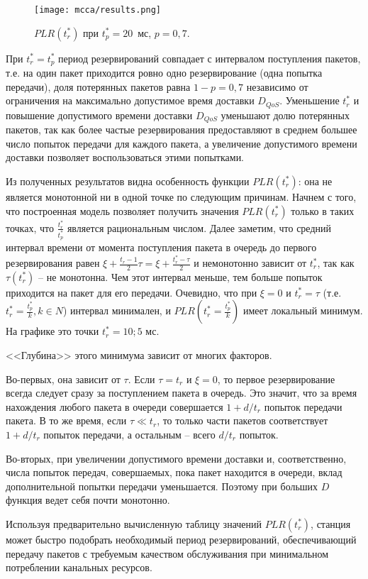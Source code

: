\begin{figure}[!htbp]
\centering
    \texttt{[image: mcca/results.png]} \\
    \caption{\label{fig:mcca:an:results:plr_vs_tc} $PLR(t_r^*)$ при $t_p^* = 20$~мс, $p = 0,7$.}
\end{figure}

При  $t_r^* = t_p^*$ период резервирований совпадает с интервалом поступления пакетов, т.е. на один пакет приходится ровно одно резервирование (одна попытка передачи), доля потерянных пакетов равна $1-p=0,7$ независимо от ограничения на максимально допустимое время доставки  $D_{QoS}$. Уменьшение $t_r^*$ и повышение допустимого времени доставки $D_{QoS}$  уменьшают долю потерянных пакетов, так как более частые резервирования предоставляют в среднем большее число попыток передачи для каждого пакета, а увеличение допустимого времени доставки позволяет воспользоваться этими попытками.

Из полученных результатов видна особенность функции $PLR(t_r^*)$: она не является монотонной ни в одной точке по следующим причинам.
Начнем с того, что построенная модель позволяет получить значения $PLR(t_r^*)$ только в таких точках, что $\frac{t_r^*}{t_p^*}$ является рациональным числом. Далее заметим, что средний интервал времени от момента поступления пакета в очередь до первого резервирования равен $\xi+\frac{t_r-1}{2}\tau=\xi+\frac{t_r^*-\tau}{2}$ и немонотонно зависит от $t_r^*$, так как $\tau(t_r^*)$ -- не монотонна. Чем этот интервал меньше, тем больше попыток приходится на пакет для его передачи. Очевидно, что при  $\xi=0$ и $t_r^*=\tau$ (т.е. $t_r^* = \frac{t_p^*}{k}, k \in N$)  интервал минимален, и  $PLR(t_r^* = \frac{t_p^*}{k})$ имеет локальный минимум. На графике это точки $t_r^*=10; 5$ мс.

<<Глубина>> этого минимума зависит от многих факторов.

Во-первых, она зависит от $\tau$. Если $\tau = t_r$ и  $\xi=0$, то первое резервирование всегда следует сразу за поступлением пакета в очередь. Это значит, что за время нахождения любого пакета в очереди совершается $1+d/t_r$ попыток передачи пакета. В то же время, если $\tau \ll t_r$, то только части пакетов соответствует $1+d/t_r$ попыток передачи, а остальным -- всего $d/t_r$ попыток.

Во-вторых, при увеличении допустимого времени доставки и, соответственно, числа попыток передач, совершаемых, пока пакет находится в очереди, вклад дополнительной попытки передачи уменьшается. Поэтому при больших $D$ функция ведет себя почти монотонно.

Используя предварительно вычисленную таблицу значений $PLR(t_r^*)$, станция может быстро подобрать необходимый период резервирований, обеспечивающий передачу пакетов с требуемым качеством обслуживания при минимальном потреблении канальных ресурсов.

